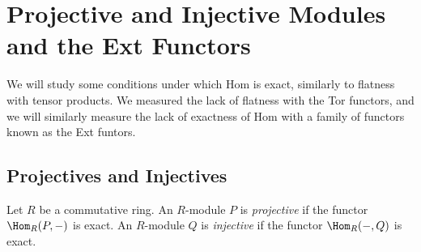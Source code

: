 \section{Projective and Injective Modules and the Ext Functors}
We will study some conditions under which Hom is exact, similarly to flatness with tensor products. We measured the lack of flatness with the Tor functors, and we will similarly measure the lack of exactness of Hom with a family of functors known as the Ext funtors.

\subsection{Projectives and Injectives}
\begin{definition}\label{dfn:8.22}
	Let $R$ be a commutative ring. An $R$-module $P$ is \emph{projective} if the functor $\Hom_{R}(P, -) $ is exact. An $R$-module $Q$ is \emph{injective} if the functor $\Hom_{R}(-, Q) $ is exact.
\end{definition}

